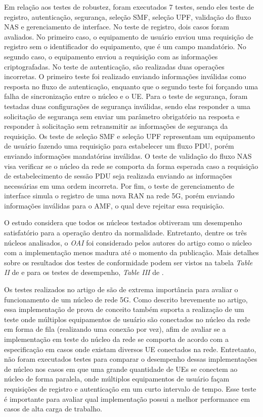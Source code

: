 Em relação aos testes de robustez, foram executados 7 testes, sendo eles teste de registro, autenticação, segurança, seleção SMF, seleção UPF, validação do fluxo NAS e gerenciamento de interface.
No teste de registro, dois casos foram avaliados. No primeiro caso, o equipamento de usuário enviou uma requisição de registro sem o identificador do equipamento, que é um campo mandatório. No segundo caso, o equipamento enviou a requisição com as informações criptografadas.
No teste de autenticação, são realizadas duas operações incorretas. O primeiro teste foi realizado enviando informações inválidas como resposta no fluxo de autenticação, enquanto que o segundo teste foi forçando uma falha de sincronização entre o núcleo e o UE.
Para o teste de segurança, foram testadas duas configurações de segurança inválidas, sendo elas responder a uma solicitação de segurança sem enviar um parâmetro obrigatório na resposta e responder à solicitação sem retransmitir as informações de segurança da requisição.
Os teste de seleção SMF e seleção UPF representam um equipamento de usuário fazendo uma requisição para estabelecer um fluxo PDU, porém enviando informações mandatórias inválidas.
O teste de validação do fluxo NAS visa verificar se o núcleo da rede se comporta da forma esperada caso a requisição de estabelecimento de sessão PDU seja realizada enviando as informações necessárias em uma ordem incorreta.
Por fim, o teste de gerenciamento de interface simula o registro de uma nova RAN na rede 5G, porém enviando informações inválidas para o AMF, o qual deve rejeitar essa requisição. 

O estudo considera que todos os núcleos testados obtiveram um desempenho satisfatório para a operação dentro da normalidade. Entretanto, dentre os três núcleos analisados, o \textit{OAI} foi considerado pelos autores do artigo como o núcleo com a implementação menos madura até o momento da publicação.
Mais detalhes sobre os resultados dos testes de conformidade podem ser vistos na tabela \textit{Table II} de  e para os testes de desempenho, \textit{Table III} de .

Os testes realizados no artigo de  são de extrema importância para avaliar o funcionamento de um núcleo de rede 5G.
Como descrito brevemente no artigo, essa implementação de prova de conceito também suporta a realização de um teste onde múltiplos equipamentos de usuário são conectados no núcleo da rede em forma de fila (realizando uma conexão por vez), afim de avaliar se a implementação em teste do núcleo da rede se comporta de acordo com a especificação em casos onde existam diversos UE conectados na rede.
Entretanto, não foram executados testes para comparar o desempenho dessas implementações de núcleo nos casos em que uma grande quantidade de UEs se conectem ao núcleo de forma paralela, onde múltiplos equipamentos de usuário façam requisições de registro e autenticação em um curto intervalo de tempo.
Esse teste é importante para avaliar qual implementação possui a melhor performance em casos de alta carga de trabalho.

